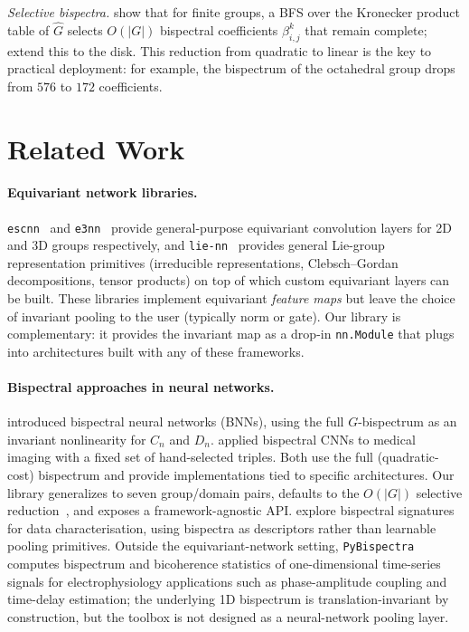 \documentclass{article}
\theoremstyle{definition}
\theoremstyle{remark}
\theoremstyle{definition}
\begin{document}
\emph{Selective bispectra.} \citet{mataigne2024selective} show that for
finite groups, a BFS over the Kronecker product
table of $\hat{G}$ selects $O(|G|)$ bispectral coefficients
$\beta_{i,j}^{k}$ that remain complete; \citet{myers2025selective}
extend this to the disk. This
reduction from quadratic to linear is the key to practical deployment:
for example, the bispectrum of the octahedral group drops from $576$ to
$172$ coefficients.

\section{Related Work}
\label{sec:related}

\paragraph{Equivariant network libraries.}
\texttt{escnn}~\citep{cesa2022program} and \texttt{e3nn}~\citep{geiger2022e3nn}
provide general-purpose equivariant convolution layers for 2D and 3D
groups respectively, and \texttt{lie-nn}~\citep{batatia2023general}
provides general Lie-group representation primitives (irreducible
representations, Clebsch--Gordan decompositions, tensor products) on
top of which custom equivariant layers can be built.  These libraries
implement equivariant \emph{feature maps} but leave the choice of
invariant pooling to the user (typically norm or gate). Our library is
complementary: it provides the invariant map as a drop-in
\texttt{nn.Module} that plugs into architectures built with any of these
frameworks.

\paragraph{Bispectral approaches in neural networks.}
\citet{sanborn2023bispectral} introduced bispectral neural networks (BNNs),
using the full $G$-bispectrum as an invariant nonlinearity for $C_n$ and $D_n$.
\citet{oreiller2022bispectral} applied bispectral CNNs to medical imaging
with a fixed set of hand-selected triples. Both use the full (quadratic-cost)
bispectrum and provide implementations tied to specific architectures.
Our library generalizes to seven group/domain pairs, defaults to the
$O(|G|)$ selective reduction~\citep{mataigne2024selective}, and exposes
a framework-agnostic API.
\citet{chevalley2024bispectral} explore bispectral signatures for data
characterisation, using bispectra as descriptors rather than learnable
pooling primitives.
Outside the equivariant-network setting,
\texttt{PyBispectra}~\citep{binns2025pybispectra} computes bispectrum
and bicoherence statistics of one-dimensional time-series signals for
electrophysiology applications such as phase-amplitude coupling and
time-delay estimation; the underlying 1D bispectrum is translation-invariant
by construction, but the toolbox is not designed as a neural-network
pooling layer.
\end{document}
